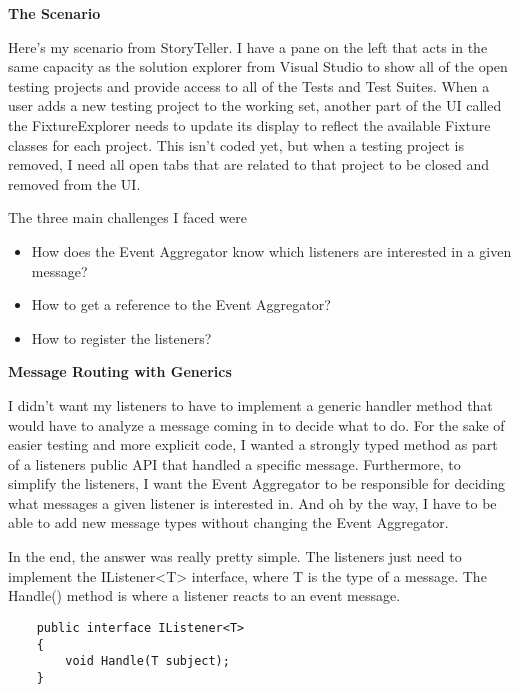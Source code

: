 \documentclass{article}
\begin{document}
{ 
\Large {\textbf{The Scenario}}

Here's my scenario from StoryTeller.  I have a pane on the left that acts in the same capacity as the solution explorer from Visual Studio to show all of the open testing projects and provide access to all of the Tests and Test Suites.  When a user adds a new testing project to the working set, another part of the UI called the FixtureExplorer needs to update its display to reflect the available Fixture classes for each project.  This isn't coded yet, but when a testing project is removed, I need all open tabs that are related to that project to be closed and removed from the UI.   

The three main challenges I faced were

 \begin{itemize}
 \item  How does the Event Aggregator know which listeners are interested in a given message?  
 \item  How to get a reference to the Event Aggregator?  
 \item  How to register the listeners?  
 \end{itemize}
 
\Large {\textbf{Message Routing with Generics}}

I didn't want my listeners to have to implement a generic handler method that would have to analyze a message coming in to decide what to do.  For the sake of easier testing and more explicit code, I wanted a strongly typed method as part of a listeners public API that handled a specific message.  Furthermore, to simplify the listeners, I want the Event Aggregator to be responsible for deciding what messages a given listener is interested in.  And oh by the way, I have to be able to add new message types without changing the Event Aggregator.

In the end, the answer was really pretty simple.  The listeners just need to implement the IListener<T> interface, where T is the type of a message.  The Handle() method is where a listener reacts to an event message. 
\begin{lstlisting}
    public interface IListener<T>
    {
        void Handle(T subject);
    }
\end{lstlisting}	

}
\end{document}
